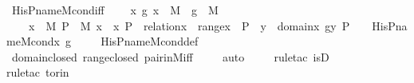 \begin{isabellebody}
\isanewline
{}\isamarkupfalse%
\ His{\isacharunderscore}{\kern0pt}P{\isacharunderscore}{\kern0pt}name{\isacharunderscore}{\kern0pt}M{\isacharunderscore}{\kern0pt}cond{\isacharunderscore}{\kern0pt}iff\ {\isacharcolon}{\kern0pt}\ \isanewline
\ \ {\isachardoublequoteopen}{\isasymAnd}x{\isacharprime}{\kern0pt}\ g{\isachardot}{\kern0pt}\ x{\isacharprime}{\kern0pt}\ {\isasymin}\ M\ {\isasymLongrightarrow}\ g\ {\isasymin}\ M\ {\isasymLongrightarrow}\ \isanewline
\ \ \ \ {\isacharparenleft}{\kern0pt}{\isasymexists}x\ {\isasymin}\ M{\isachardot}{\kern0pt}\ {\isasymexists}P\ {\isasymin}\ M{\isachardot}{\kern0pt}\ x{\isacharprime}{\kern0pt}\ {\isacharequal}{\kern0pt}\ {\isacharless}{\kern0pt}x{\isacharcomma}{\kern0pt}\ P{\isachargreater}{\kern0pt}\ {\isasymand}\ relation{\isacharparenleft}{\kern0pt}x{\isacharparenright}{\kern0pt}\ {\isasymand}\ range{\isacharparenleft}{\kern0pt}x{\isacharparenright}{\kern0pt}\ {\isasymsubseteq}\ P\ {\isasymand}\ {\isacharparenleft}{\kern0pt}{\isasymforall}y\ {\isasymin}\ domain{\isacharparenleft}{\kern0pt}x{\isacharparenright}{\kern0pt}{\isachardot}{\kern0pt}\ g{\isacharbackquote}{\kern0pt}{\isacharless}{\kern0pt}y{\isacharcomma}{\kern0pt}\ P{\isachargreater}{\kern0pt}\ {\isacharequal}{\kern0pt}\ {}{\isacharparenright}{\kern0pt}{\isacharparenright}{\kern0pt}\ {\isasymlongleftrightarrow}\ His{\isacharunderscore}{\kern0pt}P{\isacharunderscore}{\kern0pt}name{\isacharunderscore}{\kern0pt}M{\isacharunderscore}{\kern0pt}cond{\isacharparenleft}{\kern0pt}x{\isacharprime}{\kern0pt}{\isacharcomma}{\kern0pt}\ g{\isacharparenright}{\kern0pt}{\isachardoublequoteclose}\ \isanewline
%
\isadelimproof
\ \ %
\endisadelimproof
%
\isatagproof
{}\isamarkupfalse%
\ His{\isacharunderscore}{\kern0pt}P{\isacharunderscore}{\kern0pt}name{\isacharunderscore}{\kern0pt}M{\isacharunderscore}{\kern0pt}cond{\isacharunderscore}{\kern0pt}def\ \isanewline
\ \ \isamarkupfalse%
\ domain{\isacharunderscore}{\kern0pt}closed\ range{\isacharunderscore}{\kern0pt}closed\ pair{\isacharunderscore}{\kern0pt}in{\isacharunderscore}{\kern0pt}M{\isacharunderscore}{\kern0pt}iff\ \isanewline
\ \ \isamarkupfalse%
\ auto\ \ \isanewline
\ \ \isamarkupfalse%
{\isacharparenleft}{\kern0pt}rule{\isacharunderscore}{\kern0pt}tac\ is{\isacharunderscore}{\kern0pt}{}D{\isacharparenright}{\kern0pt}\ \isanewline
\ \ \ \isamarkupfalse%
{\isacharparenleft}{\kern0pt}rule{\isacharunderscore}{\kern0pt}tac\ to{\isacharunderscore}{\kern0pt}rin{\isacharparenright}{\kern0pt}\ \isanewline

\end{isabellebody}
